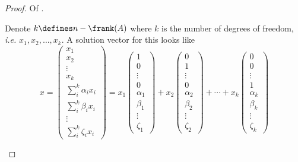 \begin{proof}
	Of .
	\begin{flushleft}
		Denote $k \defines n - \frank(A)$ where $k$ is the number of degrees of
		freedom, \textit{i.e.} $x_1,x_2,\dots,x_k$. A solution vector for this looks
		like
		\begin{equation*}
			x = \begin{pmatrix}
				x_1                   \\
				x_2                   \\
				\vdots                \\
				x_k                   \\
				\sum_i^k \alpha_i x_i \\
				\sum_i^k \beta_i x_i  \\
				\vdots                \\
				\sum_i^k \zeta_i x_i
			\end{pmatrix} =
			x_1 \begin{pmatrix}
				1        \\
				0        \\
				\vdots   \\
				0        \\
				\alpha_1 \\
				\beta_1  \\
				\vdots   \\
				\zeta_1
			\end{pmatrix} +
			x_2 \begin{pmatrix}
				0        \\
				1        \\
				\vdots   \\
				0        \\
				\alpha_2 \\
				\beta_2  \\
				\vdots   \\
				\zeta_2
			\end{pmatrix} + \cdots +
			x_k \begin{pmatrix}
				0        \\
				0        \\
				\vdots   \\
				1        \\
				\alpha_k \\
				\beta_k  \\
				\vdots   \\
				\zeta_k
			\end{pmatrix}
		\end{equation*}

\end{flushleft}
\end{proof}
